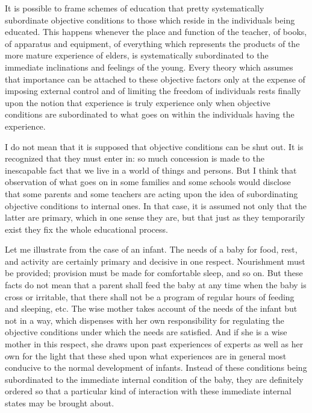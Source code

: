 It is possible to frame schemes of education that pretty systematically subordinate 
objective conditions to those which reside in the individuals being educated. This 
happens whenever the place and function of the teacher, of books, of apparatus and 
equipment, of everything which represents the products of the more mature experience of 
elders, is systematically subordinated to the immediate inclinations and feelings of the 
young. Every theory which assumes that importance can be attached to these objective 
factors only at the expense of imposing external control and of limiting the freedom of 
individuals rests finally upon the notion that experience is truly experience only when 
objective conditions are subordinated to what goes on within the individuals having the 
experience. 

I do not mean that it is supposed that objective conditions can be shut out. It is 
recognized that they must enter in: so much concession is made to the inescapable fact 
that we live in a world of things and persons. But I think that observation of what goes on 
in some families and some schools would disclose that some parents and some teachers 
are acting upon the idea of subordinating objective conditions to internal ones. In that 
case, it is assumed not only that the latter are primary, which in one sense they are, but 
that just as they temporarily exist they fix the whole educational process. 

Let me illustrate from the case of an infant. The needs of a baby for food, rest, and 
activity are certainly primary and decisive in one respect. Nourishment must be provided; 
provision must be made for comfortable sleep, and so on. But these facts do not mean 
that a parent shall feed the baby at any time when the baby is cross or irritable, that there 
shall not be a program of regular hours of feeding and sleeping, etc. The wise mother 
takes account of the needs of the infant but not in a way, which dispenses with her own 
responsibility for regulating the objective conditions under which the needs are satisfied. 
And if she is a wise mother in this respect, she draws upon past experiences of experts as 
well as her own for the light that these shed upon what experiences are in general most 
conducive to the normal development of infants. Instead of these conditions being 
subordinated to the immediate internal condition of the baby, they are definitely ordered 
so that a particular kind of interaction with these immediate internal states may be 
brought about. 

